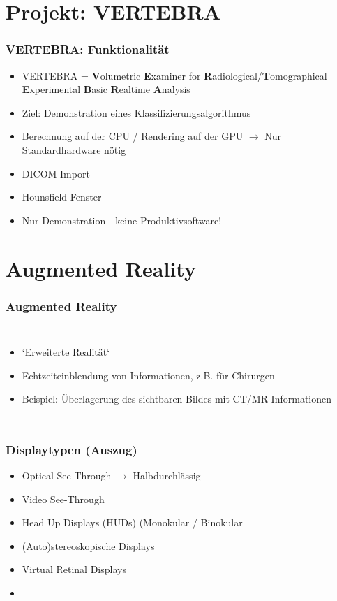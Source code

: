 \documentclass[14pt]{beamer}
\begin{document}
\section{Projekt: VERTEBRA}
\begin{frame}
\frametitle{VERTEBRA: Funktionalität}
\begin{itemize}
 \item VERTEBRA = \textbf{V}olumetric \textbf{E}xaminer for \textbf{R}adiological/\textbf{T}omographical \textbf{E}xperimental \textbf{B}asic \textbf{R}ealtime \textbf{A}nalysis
 \item Ziel: Demonstration eines Klassifizierungsalgorithmus
 \item Berechnung auf der CPU / Rendering auf der GPU $\rightarrow$ Nur Standardhardware nötig
 \item DICOM-Import
 \item Hounsfield-Fenster
 \item Nur Demonstration - keine Produktivsoftware!
\end{itemize}
\end{frame}
%
%
\section{Augmented Reality}
\begin{frame}[allowframebreaks]
\frametitle{Augmented Reality}
\begin{columns}
	    \begin{itemize}
	    \item `Erweiterte Realität`
	    \item Echtzeiteinblendung von Informationen, z.B. für Chirurgen
	    \item Beispiel: Überlagerung des sichtbaren Bildes mit CT/MR-Informationen
	    \end{itemize}
\end{columns}
\end{frame}

\begin{frame}
\frametitle{Displaytypen (Auszug)}
\begin{itemize}
 \item Optical See-Through $\rightarrow$ Halbdurchlässig
 \item Video See-Through
 \item Head Up Displays (HUDs) (Monokular / Binokular
 \item (Auto)stereoskopische Displays
 \item Virtual Retinal Displays
 \item 
\end{itemize}


\end{frame}
%
%
\end{document}
